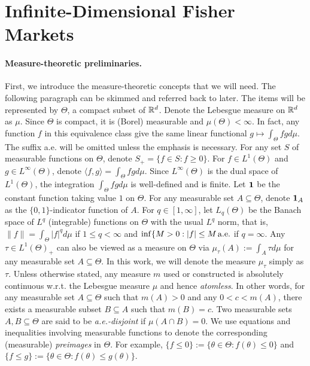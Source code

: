 
\section{Infinite-Dimensional Fisher Markets} \label{sec:inf-dim-fim-setup}

\paragraph{Measure-theoretic preliminaries.} 
First, we introduce the measure-theoretic concepts that we will need. 
The following paragraph can be skimmed and referred back to later. 
The items will be represented by $\Theta$, a compact subset of $\mathbb{R}^d$. Denote the Lebesgue measure on $\mathbb{R}^d$ as $\mu$. 
Since $\Theta$ is compact, it is (Borel) measurable and $\mu(\Theta) < \infty$. 
In fact, any function $f$ in this equivalence class give the same linear functional $g\mapsto \int_\Theta fg d\mu$. 
The suffix a.e. will be omitted unless the emphasis is necessary. For any set $S$ of measurable functions on $\Theta$, denote $S_+ = \{ f\in S: f\geq 0\}$. 
For $f \in L^1(\Theta)$ and $g\in L^\infty(\Theta)$, denote $\langle f, g\rangle = \int_\Theta fg d \mu$. Since $L^\infty(\Theta)$ is the dual space of $L^1(\Theta)$, the integration $\int_\Theta fgd\mu$ is well-defined and is finite.
Let $\mathbf{1}$ be the constant function taking value $1$ on $\Theta$. For any measurable set $A\subseteq \Theta$, denote $\mathbf{1}_A$ as the $\{0,1\}$-indicator function of $A$. 
For $q \in [1, \infty]$, let $L_q(\Theta)$ be the Banach space of $L^q$ (integrable) functions on $\Theta$ with the usual $L^q$ norm, that is, 
$ \|f\| = \int_\Theta |f|^q d\mu$ if $ 1\leq q< \infty$ and $\inf \{ M > 0: |f| \leq M\, {\rm a.e.}$ if $q=\infty$.
Any $\tau \in L^1(\Theta)_+$ can also be viewed as a measure on $\Theta$ via $\mu_\tau(A):= \int_A \tau d\mu $ for any measurable set $A\subseteq \Theta$. In this work, we will denote the measure $\mu_\tau$ simply as $\tau$.
Unless otherwise stated, any measure $m$ used or constructed is absolutely continuous w.r.t. the Lebesgue measure $\mu$ and hence \textit{atomless}. In other words, for any measurable set $A\subseteq \Theta$ such that $m(A) > 0$ and any $0 < c < m(A)$, there exists a measurable subset $B\subseteq A$ such that $m(B) = c$. 
Two measurable sets $A, B\subseteq \Theta$ are said to be \emph{a.e.-disjoint} if $\mu(A\cap B) = 0$.
We use equations and inequalities involving measurable functions to denote the corresponding (measurable) \emph{preimages} in $\Theta$.
For example, $\{ f \leq 0 \} := \{ \theta\in \Theta: f(\theta) \leq 0 \}$ and $\{ f \leq g \} := \{ \theta\in \Theta: f(\theta) \leq g(\theta) \}$.

